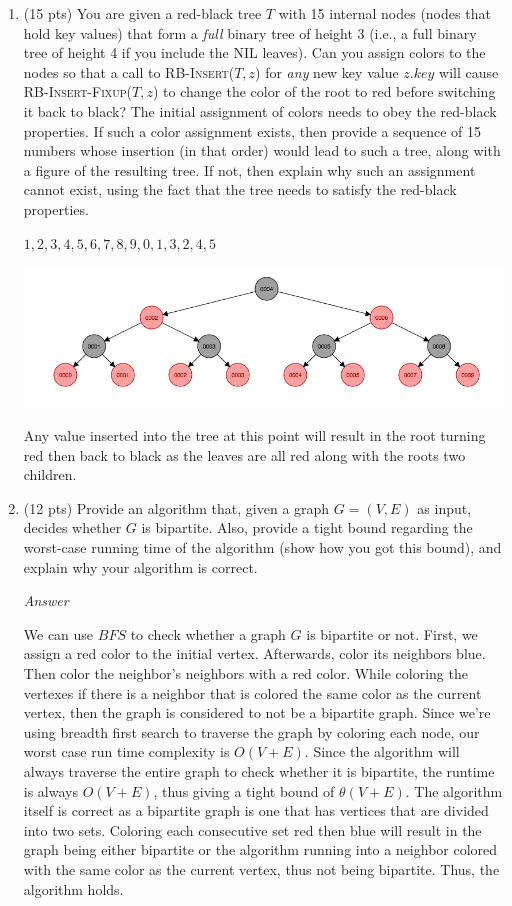 \documentclass{article}
\begin{document}
\begin{enumerate}
\newpage

\item (15 pts) You are given a red-black tree $T$ with 15 internal nodes (nodes that hold key values) 
that form a \emph{full} binary tree of height 3 (i.e., a full binary tree of height 4 if you include 
the NIL leaves). Can you assign colors to the nodes so that a call to \textsc{RB-Insert}($T,z$) for
\emph{any} new key value $z.key$ will cause \textsc{RB-Insert-Fixup}($T,z$) to change the color of the 
root to red before switching it back to black? The initial assignment of colors needs to obey the 
red-black properties. If such a color assignment exists, then provide a sequence of 15 numbers whose 
insertion (in that order) would lead to such a tree, along with a figure of the resulting tree. If not, 
then explain why such an assignment cannot exist, using the fact that the tree needs to satisfy the 
red-black properties.

$1,2,3,4,5,6,7,8,9,0,1,3,2,4,5$

\includegraphics[scale=0.6]{rbt}

Any value inserted into the tree at this point will result in the root turning red then back to black as the leaves are all red along with the roots two children. 

\newpage

\item (12 pts) Provide an algorithm that, given a graph $G=(V,E)$ as input, decides whether $G$ is
bipartite. Also, provide a tight bound regarding the worst-case running time of the algorithm (show
how you got this bound), and explain why your algorithm is correct.

\textit{Answer}

We can use $BFS$ to check whether a graph $G$ is bipartite or not. First, we assign a red color to the initial vertex. Afterwards, color its neighbors blue. Then color the neighbor's neighbors with a red color. While coloring the vertexes if there is a neighbor that is colored the same color as the current vertex, then the graph is considered to not be a bipartite graph. Since we're using breadth first search to traverse the graph by coloring each node, our worst case run time complexity is $O(V + E)$. Since the algorithm will always traverse the entire graph to check whether it is bipartite, the runtime is always $O(V + E)$, thus giving a tight bound of $\theta (V + E)$. The algorithm itself is correct as a bipartite graph is one that has vertices that are divided into two sets. Coloring each consecutive set red then blue will result in the graph being either bipartite or the algorithm running into a neighbor colored with the same color as the current vertex, thus not being bipartite. Thus, the algorithm holds. 

\end{enumerate}
\end{document}
